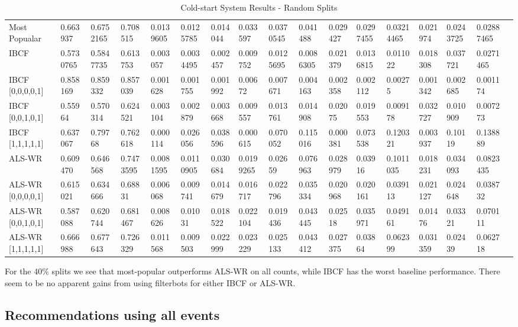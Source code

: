 \begin{table}[H]
{\begin{tabular}{*{17}{l}}
\rowcolor{Gray}
Most Popualar 		& 0.663937&	0.6752165&	0.708515&	0.0139605&	0.0125785&	0.014044&	0.033597&	0.0370545&	0.041488&	0.029427&	0.0297455&	0.03214465&	0.021974&	0.0243725&	0.02887465 & \\
\rowcolor{Gray}
IBCF 			 	& 0.5730765&	0.5847735&	0.613753&	0.003057&	0.0034495&	0.002457&	0.009752&	0.0125695&	0.0086305&	0.021379&	0.0136815&	0.011022&	0.018308&	0.037721&	0.0271465 & \\
IBCF [0,0,0,0,1] 	& 0.858169 &	0.859332&	0.857039&	0.001628&	0.001755&	0.001992&	0.00672	&	0.007671&	0.004163&	0.002358&	0.002112&	0.00275	&	0.001342&	0.002685&	0.001174	& \\
IBCF [0,0,1,0,1] 	& 0.55964  &	0.570314&	0.624521&	0.003104&	0.002879&	0.003668&	0.009557&	0.013761&	0.014908&	0.02075	&	0.019553&	0.009178&	0.032727&	0.010909&	0.007273 & \\
IBCF [1,1,1,1,1] 	& 0.637067 &	0.79768 &	0.762618&	0.000114&	0.026056&	0.038596&	0.000615&	0.070052&	0.115016&	0.000381&	0.073538&	0.120321&	0.003937&	0.10119	&	0.138889	& \\
\rowcolor{Gray}
ALS-WR			   	& 0.609470& 0.646568&	0.7473595&	0.0081595&	0.0110905&	0.030684&	0.0199265&	0.02659	&	0.076963&	0.028979&	0.03916	&	0.1011035&	0.018231&	0.034093&	0.0823435& \\
ALS-WR [0,0,0,0,1] 	& 0.615021&	0.634666&	0.68831&	0.006068&	0.009741&	0.014679&	0.016717&	0.022796&	0.035334&	0.020968&	0.020161&	0.039113&	0.021127&	0.024648&	0.038732	& \\
ALS-WR [0,0,1,0,1]	& 0.587088& 0.620744&	0.681467&	0.008626&	0.01031	&	0.018522&	0.022104&	0.019436&	0.043445&	0.02518	&	0.035971&	0.049161&	0.01476&	0.03321&	0.070111 & \\
ALS-WR [1,1,1,1,1] 	& 0.666988& 0.677643&	0.726329&	0.011568&	0.009503&	0.022999&	0.023229&	0.025133&	0.043412&	0.027375&	0.03864	&	0.062399&	0.031359&	0.02439&	0.062718	& \\

\bottomrule
\end{tabular}
}
\caption{Cold-start System Results - Random Splits}
\end{table}

For the 40\% splits we see that most-popular outperforms ALS-WR on all counts, while IBCF has the worst baseline performance. There seem to be no apparent gains
from using filterbots for either IBCF or ALS-WR.

\subsection{Recommendations using all events}

